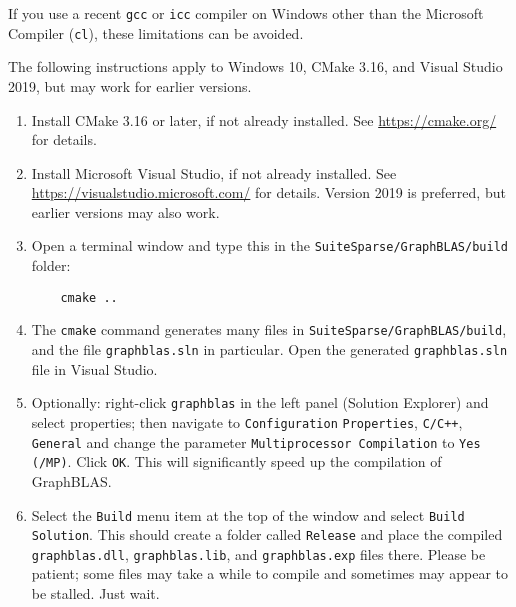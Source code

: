 \documentclass[12pt]{article}
\begin{document}
If you use a recent \verb'gcc' or \verb'icc' compiler on Windows other than the
Microsoft Compiler (\verb'cl'), these limitations can be avoided.

The following instructions apply to Windows 10, CMake 3.16, and
Visual Studio 2019, but may work for earlier versions.

\begin{enumerate}

\item Install CMake 3.16 or later, if not already installed.
    See \url{https://cmake.org/} for details.

\item Install Microsoft Visual Studio, if not already installed.
    See \url{https://visualstudio.microsoft.com/} for details.
    Version 2019 is preferred, but earlier versions may also work.

\item Open a terminal window and type this in the
    \verb'SuiteSparse/GraphBLAS/build' folder:

    \vspace{-0.1in}
    {\small
    \begin{verbatim}
    cmake ..  \end{verbatim} }
    \vspace{-0.1in}

\item The \verb'cmake' command generates many files in
    \verb'SuiteSparse/GraphBLAS/build', and the file \verb'graphblas.sln' in
    particular.  Open the generated \verb'graphblas.sln' file in Visual Studio.

\item Optionally: right-click \verb'graphblas' in the left panel (Solution
    Explorer) and select properties; then navigate to \verb'Configuration'
    \verb'Properties', \verb'C/C++', \verb'General' and change the parameter
    \verb'Multiprocessor Compilation' to \verb'Yes (/MP)'.  Click \verb'OK'.
    This will significantly speed up the compilation of GraphBLAS.

\item Select the \verb'Build' menu item at the top of the window and
    select \verb'Build Solution'.  This should create a folder called
    \verb'Release' and place the compiled \verb'graphblas.dll',
    \verb'graphblas.lib', and \verb'graphblas.exp' files there.  Please be
    patient; some files may take a while to compile and sometimes may appear to
    be stalled.  Just wait.


\end{enumerate}
\end{document}
